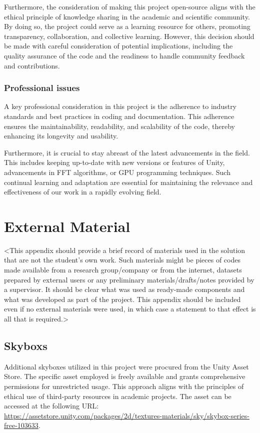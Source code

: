 \begin{appendices}
Furthermore, the consideration of making this project open-source aligns with the ethical principle of knowledge sharing in the academic and scientific community. By doing so, the project could serve as a learning resource for others, promoting transparency, collaboration, and collective learning. However, this decision should be made with careful consideration of potential implications, including the quality assurance of the code and the readiness to handle community feedback and contributions.

\subsection{Professional issues}
A key professional consideration in this project is the adherence to industry standards and best practices in coding and documentation. This adherence ensures the maintainability, readability, and scalability of the code, thereby enhancing its longevity and usability.

Furthermore, it is crucial to stay abreast of the latest advancements in the field. This includes keeping up-to-date with new versions or features of Unity, advancements in FFT algorithms, or GPU programming techniques. Such continual learning and adaptation are essential for maintaining the relevance and effectiveness of our work in a rapidly evolving field.
%
%
\chapter{External Material}
<This appendix should provide a brief record of materials used in the solution that are not the student's own work. Such materials might be pieces of codes made available from a research group/company or from the internet, datasets prepared by external users or any preliminary materials/drafts/notes provided by a supervisor. It should be clear what was used as ready-made components and what was developed as part of the project. This appendix should be included even if no external materials were used, in which case a statement to that effect is all that is required.>
\section{Skyboxs}
Additional skyboxes utilized in this project were procured from the Unity Asset Store. The specific asset employed is freely available and grants comprehensive permissions for unrestricted usage. This approach aligns with the principles of ethical use of third-party resources in academic projects. The asset can be accessed at the following URL: \url{https://assetstore.unity.com/packages/2d/textures-materials/sky/skybox-series-free-103633}.




%
%



\end{appendices}
